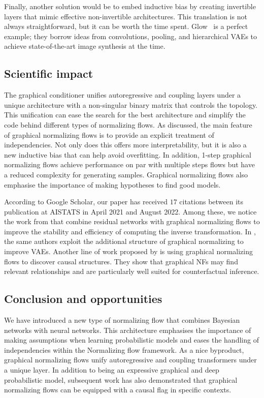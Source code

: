 Finally, another solution would be to embed inductive bias by creating invertible layers that mimic effective non-invertible architectures. This translation is not always straightforward, but it can be worth the time spent. Glow~\citep{kingma_glow_2018} is a perfect example; they borrow ideas from convolutions, pooling, and hierarchical VAEs to achieve state-of-the-art image synthesis at the time.




\subsection{Scientific impact}
The graphical conditioner unifies autoregressive and coupling layers under a unique architecture with a non-singular binary matrix that controls the topology. This unification can ease the search for the best architecture and simplify the code behind different types of normalizing flows. As discussed, the main feature of graphical normalizing flows is to provide an explicit treatment of independencies. Not only does this offers more interpretability, but it is also a new inductive bias that can help avoid overfitting. In addition, 1-step graphical normalizing flows achieve performance on par with multiple steps flows but have a reduced complexity for generating samples. Graphical normalizing flows also emphasise the importance of making hypotheses to find good models.

According to Google Scholar, our paper has received $17$ citations between its publication at AISTATS in April 2021 and August 2022. Among these, we notice the work from \citet{mouton2022graphical} that combine residual networks with graphical normalizing flows to improve the stability and efficiency of computing the inverse transformation. In \citet{mouton2022siren}, the same authors exploit the additional structure of graphical normalizing to improve VAEs. Another line of work proposed by \citet{balgi2022personalized} is using graphical normalizing flows to discover causal structures. They show that graphical NFs may find relevant relationships and are particularly well suited for counterfactual inference.

\subsection{Conclusion and opportunities}
We have introduced a new type of normalizing flow that combines Bayesian networks with neural networks. This architecture emphasises the importance of making assumptions when learning probabilistic models and eases the handling of independencies within the Normalizing flow framework. As a nice byproduct, graphical normalizing flows unify autoregressive and coupling transformers under a unique layer. In addition to being an expressive graphical and deep probabilistic model, subsequent work has also demonstrated that graphical normalizing flows can be equipped with a causal flag in specific contexts.

